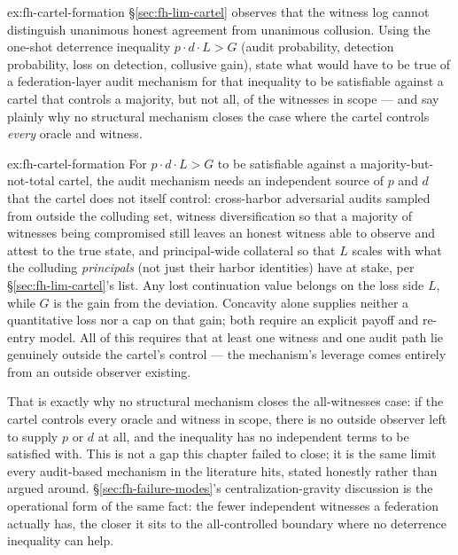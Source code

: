 \documentclass[11pt,a4paper]{article}
\theoremstyle{definition}
\theoremstyle{remark}
\begin{document}
\begin{pdexercise}[kind=Open,rating=3]{ex:fh-cartel-formation}
\S\ref{sec:fh-lim-cartel} observes that the witness log cannot distinguish unanimous honest agreement from unanimous collusion. Using the one-shot deterrence inequality $p\cdot d\cdot L>G$ (audit probability, detection probability, loss on detection, collusive gain), state what would have to be true of a federation-layer audit mechanism for that inequality to be satisfiable against a cartel that controls a majority, but not all, of the witnesses in scope --- and say plainly why no structural mechanism closes the case where the cartel controls \emph{every} oracle and witness.
\end{pdexercise}
\begin{pdsolution}{ex:fh-cartel-formation}
For $p\cdot d\cdot L>G$ to be satisfiable against a majority-but-not-total cartel, the audit mechanism needs an independent source of $p$ and $d$ that the cartel does not itself control: cross-harbor adversarial audits sampled from outside the colluding set, witness diversification so that a majority of witnesses being compromised still leaves an honest witness able to observe and attest to the true state, and principal-wide collateral so that $L$ scales with what the colluding \emph{principals} (not just their harbor identities) have at stake, per \S\ref{sec:fh-lim-cartel}'s list. Any lost continuation value belongs on the loss side $L$, while $G$ is the
gain from the deviation. Concavity alone supplies neither a quantitative loss
nor a cap on that gain; both require an explicit payoff and re-entry model. All of this requires that at least one witness and one audit path lie genuinely outside the cartel's control --- the mechanism's leverage comes entirely from an outside observer existing.

That is exactly why no structural mechanism closes the all-witnesses case: if the cartel controls every oracle and witness in scope, there is no outside observer left to supply $p$ or $d$ at all, and the inequality has no independent terms to be satisfied with. This is not a gap this chapter failed to close; it is the same limit every audit-based mechanism in the literature hits, stated honestly rather than argued around. \S\ref{sec:fh-failure-modes}'s centralization-gravity discussion is the operational form of the same fact: the fewer independent witnesses a federation actually has, the closer it sits to the all-controlled boundary where no deterrence inequality can help.
\end{pdsolution}
\end{document}
